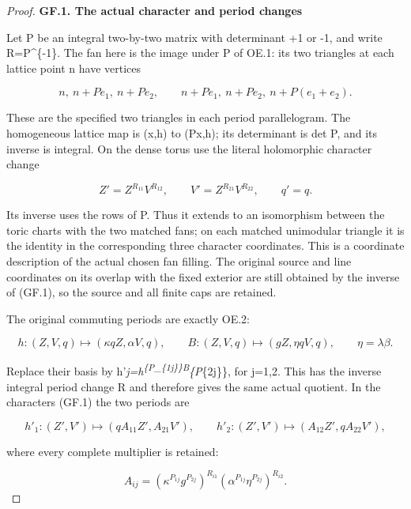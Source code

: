 \begin{proof}
\par

\medskip\noindent\textbf{GF.1. The actual character and period changes}

\par\nobreak

Let P be an integral two-by-two matrix with determinant +1 or -1, and
write R=P\^{}\{-1\}. The fan here is the image under P of OE.1: its two
triangles at each lattice point n have vertices

\[
 n,\ n+Pe_1,\ n+Pe_2,
 \qquad n+Pe_1,\ n+Pe_2,\ n+P(e_1+e_2).
\]

These are the specified two triangles in each period parallelogram.
The homogeneous lattice map is (x,h) to (Px,h); its determinant is
det P, and its inverse is integral. On the dense torus use the literal
holomorphic character change

\[
 Z'=Z^{R_{11}}V^{R_{12}},\qquad
 V'=Z^{R_{21}}V^{R_{22}},\qquad q'=q.                 \tag{GF.1}
\]

Its inverse uses the rows of P. Thus it extends to an isomorphism
between the toric charts with the two matched fans; on each matched
unimodular triangle it is the identity in the corresponding three
character coordinates. This is a coordinate description of the actual
chosen fan filling. The original source and line coordinates on its
overlap with the fixed exterior are still obtained by the inverse of
(GF.1), so the source and all finite caps are retained.

The original commuting periods are exactly OE.2:

\[
 h:(Z,V,q)\longmapsto(\kappa qZ,\alpha V,q),\qquad
 B:(Z,V,q)\longmapsto(gZ,\eta qV,q),\qquad\eta=\lambda\beta.
\]

Replace their basis by h'\emph{j=h\textsuperscript{\{P\_\{1j\}\}B}\{P}\{2j\}\}, for j=1,2.
This has the inverse integral period change R and therefore gives
the same actual quotient. In the characters (GF.1) the two periods
are

\[
 h'_1:(Z',V')\longmapsto(qA_{11}Z',A_{21}V'),\qquad
 h'_2:(Z',V')\longmapsto(A_{12}Z',qA_{22}V'),           \tag{GF.2}
\]

where every complete multiplier is retained:

\[
 A_{ij}=(\kappa^{P_{1j}}g^{P_{2j}})^{R_{i1}}
                (\alpha^{P_{1j}}\eta^{P_{2j}})^{R_{i2}}.
                                                               \tag{GF.3}
\]


\end{proof}
